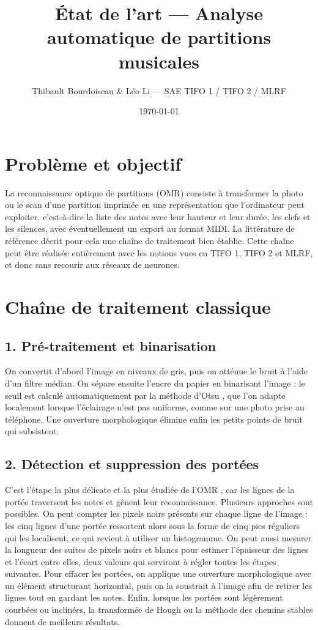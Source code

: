 \documentclass[11pt,a4paper]{article}
\title{\vspace{-1.2cm}\textbf{État de l'art --- Analyse automatique de partitions musicales}}
\author{\normalsize Thibault Bourdoiseau \& Léo Li --- SAE TIFO 1 / TIFO 2 / MLRF}
\date{\vspace{-8pt}\small \today}
\begin{document}
\maketitle
\vspace{-12pt}

\section{Problème et objectif}
La reconnaissance optique de partitions (OMR) consiste à transformer la photo ou le scan d'une partition
imprimée en une représentation que l'ordinateur peut exploiter, c'est-à-dire la liste des notes avec leur
hauteur et leur durée, les clefs et les silences, avec éventuellement un export au format MIDI. La
littérature de référence \cite{rebelo2012,bainbridge2001,calvo2020} décrit pour cela une chaîne de
traitement bien établie. Cette chaîne peut être réalisée entièrement avec les notions vues en TIFO 1,
TIFO 2 et MLRF, et donc sans recourir aux réseaux de neurones.

\section{Chaîne de traitement classique}

\subsection{1. Pré-traitement et binarisation}
On convertit d'abord l'image en niveaux de gris, puis on atténue le bruit à l'aide d'un filtre médian.
On sépare ensuite l'encre du papier en binarisant l'image : le seuil est calculé automatiquement par la
méthode d'Otsu \cite{otsu1979}, que l'on adapte localement lorsque l'éclairage n'est pas uniforme, comme
sur une photo prise au téléphone. Une ouverture morphologique élimine enfin les petits points de bruit
qui subsistent.

\subsection{2. Détection et suppression des portées}
C'est l'étape la plus délicate et la plus étudiée de l'OMR \cite{dalitz2008}, car les lignes de la portée
traversent les notes et gênent leur reconnaissance. Plusieurs approches sont possibles. On peut compter
les pixels noirs présents sur chaque ligne de l'image : les cinq lignes d'une portée ressortent alors sous
la forme de cinq pics réguliers qui les localisent, ce qui revient à utiliser un histogramme. On peut aussi
mesurer la longueur des suites de pixels noirs et blancs pour estimer l'épaisseur des lignes et l'écart
entre elles, deux valeurs qui serviront à régler toutes les étapes suivantes. Pour effacer les portées, on
applique une ouverture morphologique avec un élément structurant horizontal, puis on la soustrait à l'image
afin de retirer les lignes tout en gardant les notes. Enfin, lorsque les portées sont légèrement courbées
ou inclinées, la transformée de Hough ou la méthode des chemins stables \cite{cardoso2009} donnent de
meilleurs résultats.
\end{document}
